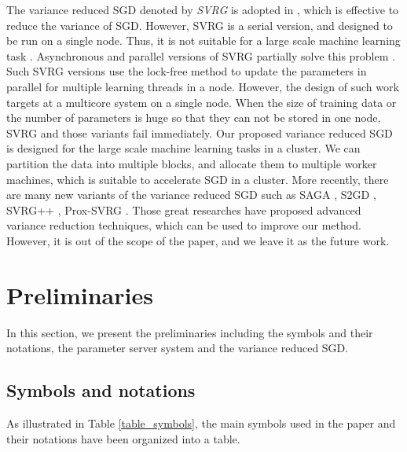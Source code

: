 \documentclass[preprint,review,11pt,a4paper]{elsarticle}
\begin{document}
The variance reduced SGD denoted by \emph{SVRG} is adopted in \cite{Johnson:9MAvkbgy}, which is  effective to reduce the variance of SGD. However, SVRG is a serial version, and designed to be run on a single node. Thus, it is not suitable for a large scale machine learning task . Asynchronous and parallel versions of SVRG partially solve this problem \cite{Zhao:SZfxEHHg, Reddi:2015vj, Mania:2015wa, lian2015asynchronous, Pan:2016wx}. Such SVRG versions use the lock-free method to update the parameters in parallel for multiple learning threads in a node. However, the design of such work targets at a multicore system on a single node. When the size of training data or the number of parameters  is huge so that they can not be stored in one node, SVRG and those variants fail immediately. Our proposed variance reduced SGD is designed for  the large scale machine learning tasks in a cluster. We can partition the data into multiple blocks, and allocate them to multiple worker machines, which is suitable to accelerate SGD in a cluster. More recently, there are many new variants of the variance reduced SGD such as SAGA \cite{Defazio:2014vu}, S2GD \cite{Richtarik:2013te}, SVRG++ \cite{Allen2015Improved}, Prox-SVRG \cite{Xiao:2014vw}. Those great researches have proposed advanced variance reduction techniques, which can be used to improve our method. However, it is out of the scope of the paper, and we leave it as the future work.


\section{Preliminaries}
\label{sect_preliminary}
In this section, we present the preliminaries including the symbols and their notations, the parameter server system  and the variance reduced SGD.

\subsection{Symbols and notations}
\label{sect_symbols}
As illustrated in Table \ref{table_symbols},  the main symbols used in the paper and their notations have been organized into a table. 
\end{document}
